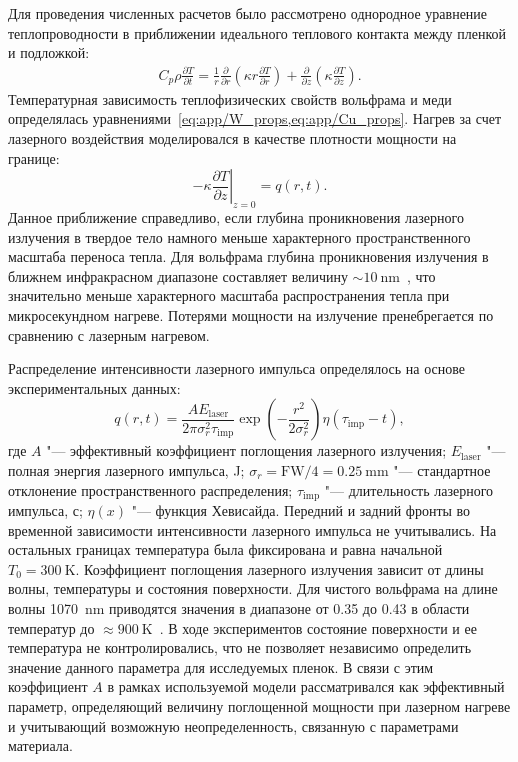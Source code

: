 Для проведения численных расчетов было рассмотрено однородное уравнение теплопроводности в приближении идеального теплового контакта между пленкой и подложкой:
\begin{align}
    C_p \rho \frac{\partial T}{\partial t} = \frac{1}{r}\frac{\partial}{\partial r}\left( \kappa r \frac{\partial T}{\partial r} \right) + \frac{\partial }{\partial z}\left( \kappa \frac{\partial T}{\partial z} \right).
\end{align}
Температурная зависимость теплофизических свойств вольфрама и меди определялась уравнениями~\cref{eq:app/W_props,eq:app/Cu_props}. Нагрев за счет лазерного воздействия моделировался в качестве плотности мощности на границе:
\begin{equation}
    -\kappa \left. \frac{\partial T}{\partial z} \right\vert_{z=0} = q(r, t).
\end{equation}
Данное приближение справедливо, если глубина проникновения лазерного излучения в твердое тело намного меньше характерного пространственного масштаба переноса тепла. Для вольфрама глубина проникновения излучения в ближнем инфракрасном диапазоне составляет величину \( \sim \SI{10}{\nano\meter} \)~\cite{Ordal1988}, что значительно меньше характерного масштаба распространения тепла при микросекундном нагреве. Потерями мощности на излучение пренебрегается по сравнению с лазерным нагревом.

Распределение интенсивности лазерного импульса определялось на основе экспериментальных данных:
\begin{equation}
    q(r,t)=\frac{A E_\mathrm{laser}}{2\pi \sigma_{r}^2\tau_\mathrm{imp}} \exp \left( -\frac{r^2}{2 \sigma_r^2} \right) \eta \left( \tau_\mathrm{imp}-t \right),
\end{equation}
где \(A \) "--- эффективный коэффициент поглощения лазерного излучения; $E_\mathrm{laser}$ "--- полная энергия лазерного импульса, \si{\joule}; $\sigma_r=\mathrm{FW}/4=\SI{0.25}{\milli\meter}$ "--- стандартное отклонение пространственного распределения; \( \tau_\mathrm{imp} \) "--- длительность лазерного импульса, с; \(\eta(x)\) "--- функция Хевисайда. Передний и задний фронты во временной зависимости интенсивности лазерного импульса не учитывались. На остальных границах температура была фиксирована и равна начальной \(T_0=\SI{300}{\kelvin}\). Коэффициент поглощения лазерного излучения зависит от длины волны, температуры и состояния поверхности. Для чистого вольфрама на длине волны \SI{1070}{\nano\meter} приводятся значения в диапазоне от \num{0.35} до \num{0.43} в области температур до \( \approx \SI{900}{\kelvin} \)~\cite{Minissale2017}. В ходе экспериментов состояние поверхности и ее температура не контролировались, что не позволяет независимо определить значение данного параметра для исследуемых пленок. В связи с этим коэффициент \( A \) в рамках используемой модели рассматривался как эффективный параметр, определяющий величину поглощенной мощности при лазерном нагреве и учитывающий возможную неопределенность, связанную с параметрами материала.

